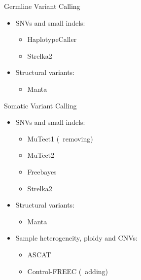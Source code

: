 \documentclass[usepdftitle=false]{beamer}
\begin{document}
\begin{frame}{Germline Variant Calling}
	\begin{itemize}
		\item SNVs and small indels:
		\pause
	\begin{itemize}
			\item HaplotypeCaller
			\item Strelka2
		\end{itemize}
		\pause
		\item Structural variants:
		\pause
		\begin{itemize}
			\item Manta
		\end{itemize}
	\end{itemize}
\end{frame}

\begin{frame}{Somatic Variant Calling}
	\begin{itemize}
		\item SNVs and small indels:
		\pause
		\begin{itemize}
			\item MuTect1 (\faWrench\ removing)
			\item MuTect2
			\item Freebayes
			\item Strelka2
		\end{itemize}
		\pause
		\item Structural variants:
		\pause
		\begin{itemize}
			\item Manta
		\end{itemize}
		\pause
		\item Sample heterogeneity, ploidy and CNVs:
		\pause
		\begin{itemize}
			\item ASCAT
			\item Control-FREEC (\faWrench\ adding)
		\end{itemize}
	\end{itemize}
\end{frame}
\end{document}
